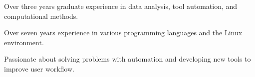

\begin{cvparagraph}


\begin{cvitems}

\vspace{3mm}
\item{Over three years graduate experience in data analysis, tool automation, and computational methods.}
\item{Over seven years experience in various programming languages and the Linux environment.}
\item{Passionate about solving problems with automation and developing new tools to improve user workflow.}
\end{cvitems}
\end{cvparagraph}
